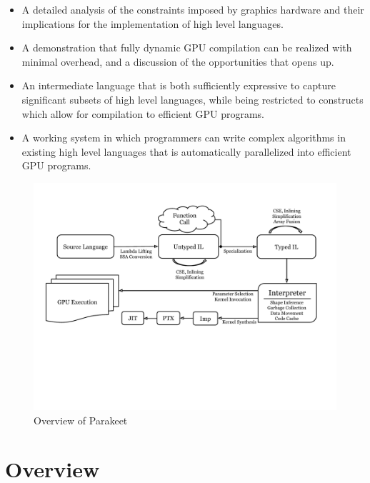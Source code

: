 \documentclass[preprint]{sigplanconf}
\begin{document}
\begin{itemize}
\item A detailed analysis of the constraints imposed by graphics hardware and their implications for the implementation of high level languages.

\item A demonstration that fully dynamic GPU compilation can be realized with minimal overhead, and a discussion of the opportunities that opens up.

\item An intermediate language that is both sufficiently expressive to capture significant subsets of high level languages, while being restricted to constructs which allow for compilation to efficient GPU programs.

\item A working system in which programmers can write complex algorithms in existing high level languages that is automatically parallelized into efficient GPU programs.
\end{itemize}

\begin{figure}[t!bh]
\begin{center}
\leavevmode
\includegraphics[scale=0.6, trim=10pt 180pt 10pt 120pt]{Pipeline.pdf}
\end{center}
\caption{Overview of Parakeet}
\label{fig:overview}
\end{figure}
\section{Overview}
\label{overview}
\end{document}
